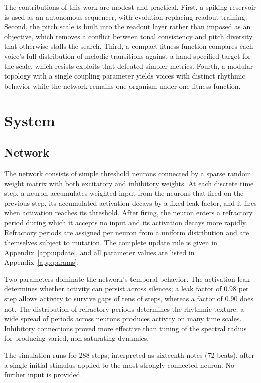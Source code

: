 \documentclass[conference]{IEEEtran}
\begin{document}
The contributions of this work are modest and practical. First, a spiking reservoir is used as an autonomous sequencer, with evolution replacing readout training. Second, the pitch scale is built into the readout layer rather than imposed as an objective, which removes a conflict between tonal consistency and pitch diversity that otherwise stalls the search. Third, a compact fitness function compares each voice's full distribution of melodic transitions against a hand-specified target for the scale, which resists exploits that defeated simpler metrics. Fourth, a modular topology with a single coupling parameter yields voices with distinct rhythmic behavior while the network remains one organism under one fitness function.

\section{System}

\subsection{Network}

The network consists of simple threshold neurons connected by a sparse random weight matrix with both excitatory and inhibitory weights. At each discrete time step, a neuron accumulates weighted input from the neurons that fired on the previous step, its accumulated activation decays by a fixed leak factor, and it fires when activation reaches its threshold. After firing, the neuron enters a refractory period during which it accepts no input and its activation decays more rapidly. Refractory periods are assigned per neuron from a uniform distribution and are themselves subject to mutation. The complete update rule is given in Appendix~\ref{app:update}, and all parameter values are listed in Appendix~\ref{app:params}.

Two parameters dominate the network's temporal behavior. The activation leak determines whether activity can persist across silences; a leak factor of 0.98 per step allows activity to survive gaps of tens of steps, whereas a factor of 0.90 does not. The distribution of refractory periods determines the rhythmic texture; a wide spread of periods across neurons produces activity on many time scales. Inhibitory connections proved more effective than tuning of the spectral radius for producing varied, non-saturating dynamics.

The simulation runs for 288 steps, interpreted as sixteenth notes (72 beats), after a single initial stimulus applied to the most strongly connected neuron. No further input is provided.
\end{document}
